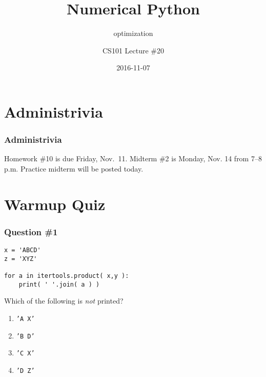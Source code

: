 \documentclass[11pt]{beamer}
\title{Numerical Python}
\subtitle{optimization}
\author{CS101 Lecture \#20}
\date{2016-11-07}
\begin{document}
  \setcounter{showProgressBar}{0}
  \setcounter{showSlideNumbers}{0}

\frame{\titlepage}

\setcounter{framenumber}{0}
\setcounter{showProgressBar}{1}
\setcounter{showSlideNumbers}{1}

\section{Administrivia}

\begin{frame}
  \frametitle{Administrivia}
  \Enlarge

  \begin{itemize}
  \myitem  Homework \#10 is due Friday, Nov.\ 11.
  \myitem  Midterm \#2 is Monday, Nov. 14 from 7--8 p.m.
  \mysubitem \textcolor{CS101PureBase}{Practice midterm will be posted today.}
  \end{itemize}
\end{frame}

\section{Warmup Quiz}

\begin{frame}[fragile]
  \frametitle{Question \#1}

  \begin{Verbatim}
x = 'ABCD'
z = 'XYZ'

for a in itertools.product( x,y ):
    print( ' '.join( a ) )
  \end{Verbatim}

Which of the following is \emph{not} printed?

  \begin{enumerate}[label=\Alph*]
    \item  \texttt{'A X'}
    \item  \texttt{'B D'}
    \item  \texttt{'C X'}
    \item  \texttt{'D Z'}
  \end{enumerate}
\end{frame}
\end{document}
